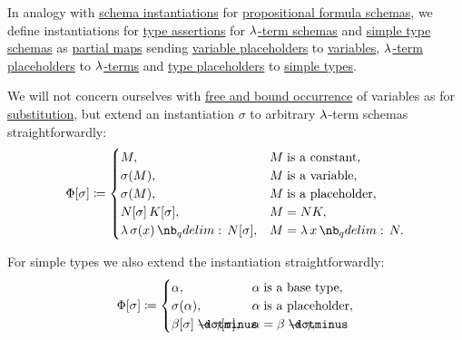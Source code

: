 \begin{definition}\label{def:lambda_schema_instantiation}
  In analogy with \hyperref[def:propositional_schema_instantiation]{schema instantiations} for \hyperref[def:propositional_formula_schema]{propositional formula schemas}, we define instantiations for \hyperref[def:type_assertion]{type assertions} for \hyperref[def:lambda_term_schema]{\( \mathrm{\lambda} \)-term schemas} and \hyperref[def:simple_type_schema]{simple type schemas} as \hyperref[def:set_valued_map/partial]{partial maps} sending \hyperref[def:lambda_term_schema]{variable placeholders} to \hyperref[def:lambda_term]{variables}, \hyperref[def:lambda_term_schema]{\( \mathrm{\lambda} \)-term placeholders} to \hyperref[def:lambda_term]{\( \mathrm{\lambda} \)-terms} and \hyperref[def:simple_type_schema]{type placeholders} to \hyperref[def:simple_type]{simple types}.

  \begin{thmenum}
     We will not concern ourselves with \hyperref[def:lambda_variable_occurrence]{free and bound occurrence} of variables as for \hyperref[def:lambda_term_schema_substitution]{substitution}, but extend an instantiation \( \sigma \) to arbitrary \( \mathrm{\lambda} \)-term schemas straightforwardly:
    \begin{equation}\label{eq:def:lambda_schema_instantiation/terms}
      \Phi[\sigma] \coloneqq \begin{cases}
        M,                               &M \T{is a constant}, \\
        \sigma(M),                       &M \T{is a variable}, \\
        \sigma(M),                       &M \T{is a placeholder}, \\
        N[\sigma] \thinspace K[\sigma],  &M = NK,              \\
        \qabs {\sigma(x)} N[\sigma],     &M = \qabs x N.       \\
      \end{cases}
    \end{equation}

     For simple types we also extend the instantiation straightforwardly:
    \begin{equation}\label{eq:def:lambda_schema_instantiation/types}
      \Phi[\sigma] \coloneqq \begin{cases}
        \alpha,                                   &\alpha \T{is a base type},   \\
        \sigma(\alpha),                           &\alpha \T{is a placeholder}, \\
        \beta[\sigma] \synimplies \gamma[\sigma], &\alpha = \beta \synimplies \gamma,  \\
      \end{cases}
    \end{equation}


\end{thmenum}
\end{definition}
